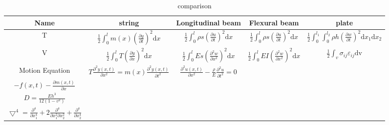 \documentclass{article}
\begin{document}
\begin{multicols*}{2}
  \begin{table*}
    \centering
    \caption{comparison}
    \begin{tabular}{|c|c|c|c|c|}
      \hline
      Name&string&Longitudinal beam& Flexural beam&plate\\
      \hline
      T&$\frac{1}{2}\int_{0}^{l}m(x)(\frac{\partial y}{\partial t})^{2}\text{d}x$
      &$\frac{1}{2}\int_{0}^{l}\rho s(\frac{\partial u}{\partial t})^{2}\text{d}x$
      &$\frac{1}{2}\int_{0}^{l}\rho s(\frac{\partial u}{\partial t})^{2}\text{d}x$
      &$\frac{1}{2}\int_{0}^{l_{1}}\int_{0}^{l_{2}}\rho h(\frac{\partial w}{\partial t})^{2}\text{d}x_{1}\text{d}x_{2}$\\
      \hline
      V&$\frac{1}{2}\int_{0}^{l}T(\frac{\partial y}{\partial x})^{2}\text{d}x$
      &$\frac{1}{2}\int_{0}^{l}Es(\frac{\partial^{2} w}{\partial x^{2}})^{2}\text{d}x$
      &$\frac{1}{2}\int_{0}^{l}EI(\frac{\partial^{2} w}{\partial x^{2}})^{2}\text{d}x$
      &$\frac{1}{2}\int_{v}\sigma_{ij}\varepsilon_{ij} \text{d}$v\\
      \hline
      Motion Equation&$T\frac{\partial ^{2}y(x,t)}{\partial x^{2}}=m(x)\frac{\partial^{2}y(x,t)}{\partial t^{2}}$
      &$\frac{\partial^{2}u(x,t)}{\partial x^{2}}-\frac{\rho}{E}\frac{\partial^{2}u}{\partial t^{2}}=0$
      &\makecell[c]{$\frac{\partial ^{2}}{\partial x^{2}}(EI\frac{\partial^{2}w}{\partial x^{2}})+\rho s \frac{\partial^{2}w}{\partial t^{2}}=$ \\ $-f(x,t)-\frac{\partial m(x,t)}{\partial x}$}
      &\makecell[c]{$D \bigtriangledown ^{4}w+\rho h \frac{\partial ^{2}}{\partial t^{2}}=f$\\
      $D=\frac{Eh^{3}}{12(1-v^{2})}$\\$\bigtriangledown^{4}=\frac{\partial ^{4}}{\partial x_{1}^{4}}+2\frac{\partial ^{4}}{\partial x_{1}^{2}\partial x_{2}^{2}}+\frac{\partial ^{4}}{\partial x_{2}^{4}}$}\\
      \hline
    \end{tabular}
  \end{table*}


\end{multicols*}
\end{document}
